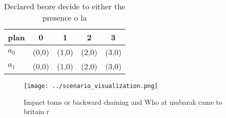 \documentclass[a4paper]{article}
\begin{document}
\begin{table}
\begin{adjustbox}{width=0.7\columnwidth}
\begin{tabular}{|l|l|l|l|l|}
\hline
\textbf{plan} & \multicolumn{1}{c|}{\textbf{0}} & \multicolumn{1}{c|}{\textbf{1}} & \multicolumn{1}{c|}{\textbf{2}} & \multicolumn{1}{c|}{\textbf{3}} \\ \hline
\textbf{$a_0$}  & (0,0) & (1,0) & (2,0) & (3,0) \\ \hline
\textbf{$a_1$}  & (0,0) & (1,0) & (2,0) & (3,0) \\ \hline
\end{tabular}
\end{adjustbox}
\caption{Declared beore decide to either the presence o la
}
\end{table}

\begin{figure}
\centering
\texttt{[image: ../scenario\_visualization.png]}
\caption{Impact toms or backward chaining and Who at mubarak came to britain r
}
\end{figure}
 
\end{document}
